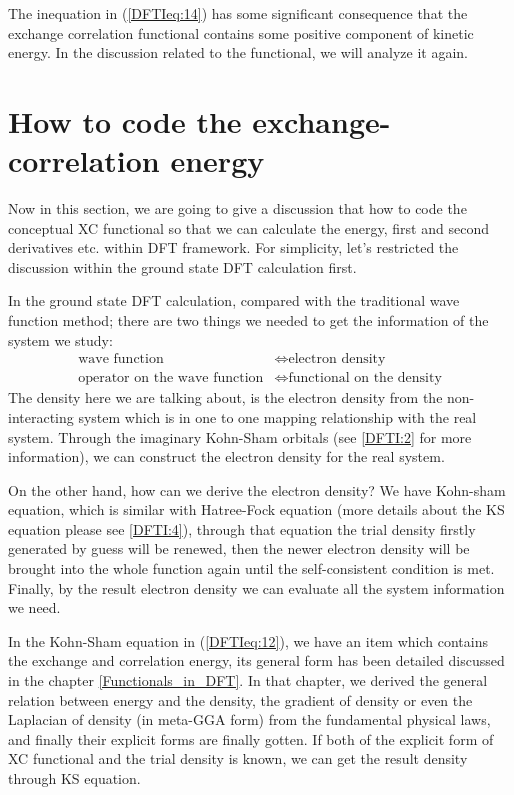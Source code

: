 The inequation in (\ref{DFTIeq:14}) has some significant consequence
that the exchange correlation functional contains some positive
component of kinetic energy. In the discussion related to the
functional, we will analyze it again.

\section{How to code the exchange-correlation energy}
\label{sec:XC_functional}
%
%
%
%
Now in this section, we are going to give a discussion that how to
code the conceptual XC functional so that we can calculate the energy,
first and second derivatives etc. within DFT framework. For
simplicity, let's restricted the discussion within the ground state
DFT calculation first.

In the ground state DFT calculation, compared with the traditional
wave function method; there are two things we needed to get the
information of the system we study:
\begin{align}
 \label{eq:XC_functional.1}
\text{wave function} &\Leftrightarrow \text{electron density}
\nonumber
\\
\text{operator on the wave function} &\Leftrightarrow \text{functional
  on the density}
\end{align}
The density here we are talking about, is the electron density from
the non-interacting system which is in one to one mapping relationship
with the real system. Through the imaginary Kohn-Sham orbitals (see
\ref{DFTI:2} for more information), we can construct the electron
density for the real system.

On the other hand, how can we derive the electron density? We have
Kohn-sham equation, which is similar with Hatree-Fock equation (more
details about the KS equation please see \ref{DFTI:4}), through that
equation the trial density firstly generated by guess will be renewed,
then the newer electron density will be brought into the whole
function again until the self-consistent condition is met. Finally, by
the result electron density we can evaluate all the system information
we need.

In the Kohn-Sham equation in (\ref{DFTIeq:12}), we have an item which
contains the exchange and correlation energy, its general form has
been detailed discussed in the chapter \ref{Functionals_in_DFT}. In
that chapter, we derived the general relation between energy and the
density, the gradient of density or even the Laplacian of density
(in meta-GGA form) from the fundamental physical laws, and finally
their explicit forms are finally gotten. If both of the explicit form
of XC functional and the trial density is known, we can get the result
density through KS equation.

